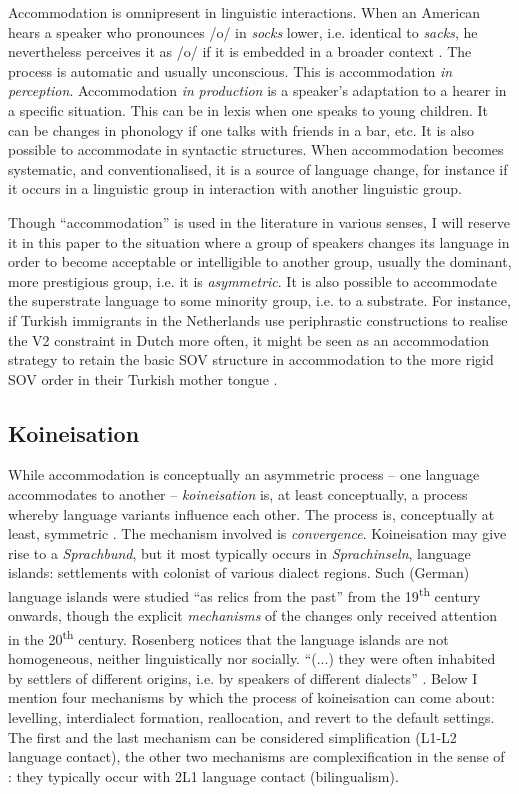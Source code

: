 \documentclass[output=paper,hidelinks,draftmode]{langscibook}
\begin{document}
Accommodation is omnipresent in linguistic interactions. When an American hears a speaker who pronounces /o/ in \textit{socks} lower, i.e. identical to \textit{sacks}, he nevertheless perceives it as /o/ if it is embedded in a broader context \citep[68--70]{Labov2010}. The process is automatic and usually unconscious. This is accommodation \textit{in} \textit{perception}. Accommodation \textit{in} \textit{production} is a speaker's adaptation to a hearer in a specific situation. This can be in lexis when one speaks to young children. It can be changes in phonology if one talks with friends in a bar, etc. It is also possible to accommodate in syntactic structures. When accommodation becomes systematic, and conventionalised, it is a source of language change, for instance if it occurs in a linguistic group in interaction with another linguistic group. 

Though ``accommodation'' is used in the literature in various senses, I will reserve it in this paper to the situation where a group of speakers changes its language in order to become acceptable or intelligible to another group, usually the dominant, more prestigious group, i.e. it is \textit{asymmetric}. It is also possible to accommodate the superstrate language to some minority group, i.e. to a substrate. For instance, if Turkish immigrants in the Netherlands use periphrastic constructions to realise the V2 constraint in Dutch more often, it might be seen as an accommodation strategy to retain the basic SOV structure in accommodation to the more rigid SOV order in their Turkish mother tongue \citep{Craats2009}.

\subsection{Koineisation}\label{sec:postma:2.2}


While accommodation is conceptually an asymmetric process – one language accommodates to another – \textit{koineisation} is, at least conceptually, a process whereby language variants influence each other. The process is, conceptually at least, symmetric \citep{GumperzWilson1971}. The mechanism involved is \textit{convergence}. Koineisation may give rise to a \textit{Sprachbund}, but it most typically occurs in \textit{Sprachinseln}, language islands: settlements with colonist of various dialect regions. Such (German) language islands were studied ``as relics from the past'' \citep[222]{Rosenberg2005} from the 19\textsuperscript{th} century onwards, though the explicit \textit{mechanisms} of the changes only received attention in the 20\textsuperscript{th} century. Rosenberg notices that the language islands are not homogeneous, neither linguistically nor socially. ``(...) they were often inhabited by settlers of different origins, i.e. by speakers of different dialects'' \citep[223]{Rosenberg2005}. Below I mention four mechanisms by which the process of koineisation can come about: levelling, interdialect formation, reallocation, and revert to the default settings. The first and the last mechanism can be considered simplification (L1-L2 language contact), the other two mechanisms are complexification in the sense of \citet{Trudgill2011}: they typically occur with 2L1 language contact (bilingualism).
\end{document}
